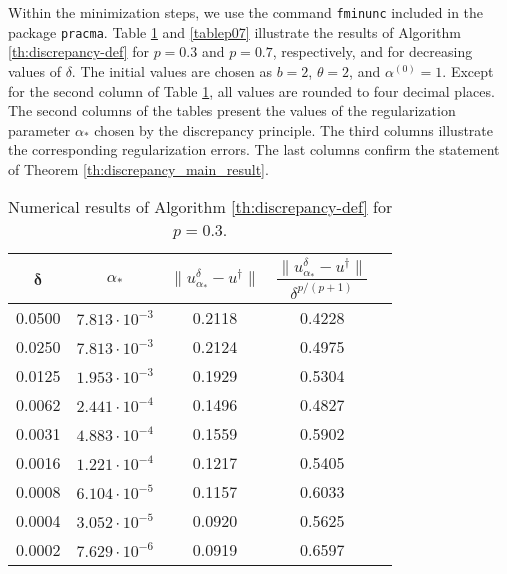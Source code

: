 \documentclass[10pt]{article}
\theoremstyle{definition}
\begin{document}
Within the minimization steps, we use the command \texttt{fminunc} included in the package \texttt{pracma}.
Table \ref{tablep03} and \ref{tablep07} illustrate the results of Algorithm \ref{th:discrepancy-def} for $p=0.3$ and $p=0.7$, respectively, and for decreasing values of $\delta$.
The initial values are chosen as $b=2$, $\theta=2$, and $\alpha^{(0)}=1$. Except for the second column of Table \ref{tablep03}, all values are rounded to four decimal places.
The second columns of the tables present the values of the regularization parameter $\alpha_{\ast}$ chosen by the discrepancy principle.
The third columns illustrate the corresponding regularization errors. The last columns confirm the statement of Theorem \ref{th:discrepancy_main_result}.
%
\begin{table}
\caption{Numerical results of Algorithm \ref{th:discrepancy-def} for $p=0.3$.}\label{tablep03}
\begin{center}
\begin{tabular}{@{}ccccc}
\hline
$\mathbf{\delta}$  & $\alpha_{\ast}$ &$\lVert u_{\alpha_{\ast}}^{\delta}-u^{\dagger}\rVert$ & $\dfrac{\lVert u_{\alpha_{\ast}}^{\delta}-u^{\dagger}\rVert}{\delta^{p/(p+1)}}$ \\
\hline
0.0500 & $7.813 \cdot 10^{-3}$ & 0.2118  & 0.4228 \\
0.0250 & $7.813 \cdot 10^{-3}$ & 0.2124  & 0.4975 \\
0.0125 & $1.953 \cdot 10^{-3}$ & 0.1929  & 0.5304 \\
0.0062 & $2.441 \cdot 10^{-4}$ & 0.1496  & 0.4827 \\
0.0031 & $4.883 \cdot 10^{-4}$ & 0.1559  & 0.5902 \\
0.0016 & $1.221 \cdot 10^{-4}$ & 0.1217  & 0.5405 \\
0.0008 & $6.104 \cdot 10^{-5}$ & 0.1157  & 0.6033 \\
0.0004 & $3.052 \cdot 10^{-5}$ & 0.0920  & 0.5625 \\
0.0002 & $7.629 \cdot 10^{-6}$ & 0.0919  & 0.6597 \\
\hline
\end{tabular}
\end{center}
\end{table}
%
\end{document}
